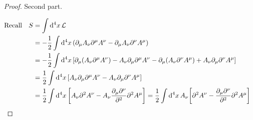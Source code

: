 \documentclass[letterpaper]{article}
\theoremstyle{definition}
\begin{document}
\begin{proof}Second part.

  \begin{align*}
    \qq*{Recall} S & =\int\dd[4]{x}\mathcal {L}                                                                                                                                                                                                                       \\
                   & =-\frac{1}{2}\int\dd[4]{x}\pqty{\partial_\mu A_\nu \partial^\mu A^\nu -\partial_\mu A_\nu \partial^\nu A^\mu}                                                                                                                                    \\
                   & =-\frac{1}{2}\int\dd[4]{x}\bqty{\partial_\mu (A_\nu \partial^\mu A^\nu) - A_\nu \partial_\mu\partial^\mu A^\nu -\partial_\mu (A_\nu \partial^\nu A^\mu) + A_\nu \partial_\mu\partial^\nu A^\mu}                                                  \\
                   & =\frac{1}{2}\int\dd[4]{x}\bqty{A_\nu \partial_\mu\partial^\mu A^\nu - A_\nu \partial_\mu\partial^\nu A^\mu}                                                                                                                                      \\
                   & =\frac{1}{2}\int\dd[4]{x}\bqty{A_\nu \partial^2 A^\nu - A_\nu \frac{\partial_\mu\partial^\nu}{\partial^2} \partial^2 A^\mu}=\frac{1}{2}\int\dd[4]{x}A_\nu\bqty{\partial^2 A^\nu  - \frac{\partial_\mu\partial^\nu}{\partial^2}\partial^2 A^\mu } \\
  \end{align*}


\end{proof}
\end{document}

